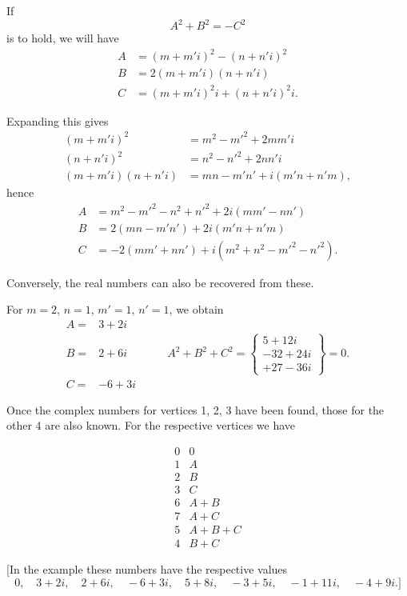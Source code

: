 
If
\[
A^2 + B^2 = -C^2
\]
is to hold, we will have
\[\begin{aligned}
A &= (m+m'i)^2 - (n+n'i)^2 \\
B &= 2(m+m'i)(n+n'i) \\
C &= (m+m'i)^2 i + (n+n'i)^2 i.
\end{aligned}\]

Expanding this gives
\[\begin{aligned}
(m+m'i)^2 &= m^2 - m'^2 + 2mm'i \\
(n+n'i)^2 &= n^2 - n'^2 + 2nn'i \\
(m+m'i)(n+n'i) &= mn - m'n' + i(m'n+n'm),
\end{aligned}\]
hence
\[\begin{aligned}
A &= m^2 - m'^2 - n^2 + n'^2 + 2i(mm' - nn') \\
B &= 2(mn - m'n') + 2i(m'n+n'm) \\
C &= -2(mm'+nn') + i(m^2+n^2-m'^2-n'^2).
\end{aligned}\]

Conversely, the real numbers can also be recovered from these.

For $m = 2$, $n = 1$, $m' = 1$, $n' = 1$, we obtain
\[
\begin{array}{lcl}
A = & 3+2i & \\
B = & 2+6i & \qquad A^2+B^2+C^2 = \left\{\begin{array}{r} 5+12i \\ -32+24i \\ +27-36i \end{array}\right\} = 0. \\
C = & -6+3i &
\end{array}
\]

 Once the complex numbers for vertices 1, 2, 3 have been found, those for
the other 4 are also known. For the respective vertices we have
\begin{center}\begin{minipage}{3.3cm}\[
\begin{array}{cc}
0 & 0 \\
1 & A \\
2 & B \\
3 & C \\
6 & A+B \\
7 & A+C \\
5 & A+B+C \\
4 & B+C
\end{array}
\]

\end{minipage}\hspace{.4cm}\begin{minipage}{7.1cm}\end{minipage}\end{center}

[In the example these numbers have the respective values
\[
0,\quad 3+2i,\quad 2+6i,\quad -6+3i,\quad 5+8i,\quad -3+5i,\quad -1+11i,\quad -4+9i.]
\]
